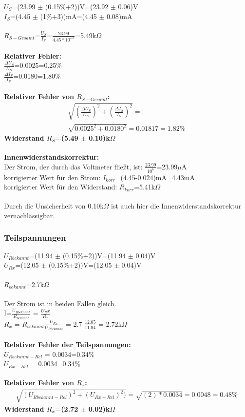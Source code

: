 \documentclass{article}
\begin{document}
$U_S$=(23.99 $\pm$ (0.15\%+2))V=(23.92 $\pm$ 0.06)V\\
$I_S$=(4.45 $\pm$ (1\%+3))mA=(4.45 $\pm$ 0.08)mA\\
\\
$R_{S-Gesamt}$=$\frac{U_S}{I_S}$=$\frac{23.99}{4.45*10^{-3}}$=5.49k$\Omega$\\
\\
\textbf{Relativer Fehler:}\\
$\frac{\Delta U_S}{U_S}$=0.0025=0.25\%\\
$\frac{\Delta I_S}{I_S}$=0.0180=1.80\%\\
\\
\textbf{Relativer Fehler von $R_{S-Gesamt}$:}\\
\begin{gather}
\sqrt{(\frac{\Delta U_S}{U_S})^2+(\frac{\Delta I_S}{I_S})^2 }=\\
\sqrt{0.0025^2+0.0180^2}=0.01817=1.82\%
\end{gather}
\textbf{Widerstand $R_S$=(5.49 $\pm$ 0.10)k$\Omega$}\\
\\
\textbf{Innenwiderstandskorrektur:}\\
Der Strom, der durch das Voltmeter fließt, ist: $\frac{23.99}{10^6}$=23.99$\mu$A\\
korrigierter Wert für den Strom: $I_{korr}$=(4.45-0.024)mA=4.43mA\\
korrigierter Wert für den Widerstand: $R_{korr}$=5.41k$\Omega$\\
\\
Durch die Unsicherheit von 0.10k$\Omega$ ist auch hier die Innenwiderstandskorrektur vernachlässigbar.\\

\subsubsection*{Teilspannungen}
$U_{Rbekannt}$=(11.94 $\pm$ (0.15\%+2))V=(11.94 $\pm$ 0.04)V\\
$U_{Rx}$=(12.05 $\pm$ (0.15\%+2))V=(12.05 $\pm$ 0.04)V\\
\\
$R_{bekannt}$=2.7k$\Omega$\\
\\
Der Strom ist in beiden Fällen gleich. \\
I=$\frac{U_{Rbekannt}}{R_{bekannt}}$ = $\frac{U_Rx}{R_x}$\\
$R_x$ = $R_{bekannt}$$\frac{U_{Rx}}{U_{Rbekannt}}$ = 2.7 $\frac{12.05}{11.94}$ = 2.72k$\Omega$\\
\\
\textbf{Relativer Fehler der Teilspannungen:}\\
$U_{Rbekannt-Rel}$ = 0.0034=0.34\%\\
$U_{Rx-Rel}$ = 0.0034=0.34\%\\
\\
\textbf{Relativer Fehler von $R_x$:}\\
\begin{gather}	
\sqrt{(U_{Rbekannt-Rel})^2+(U_{Rx-Rel})^2)}=\sqrt{(2)*0.0034}=0.0048=0.48\%
\end{gather}
\textbf{Widerstand $R_x$=(2.72 $\pm$ 0.02)k$\Omega$}
\end{document}

